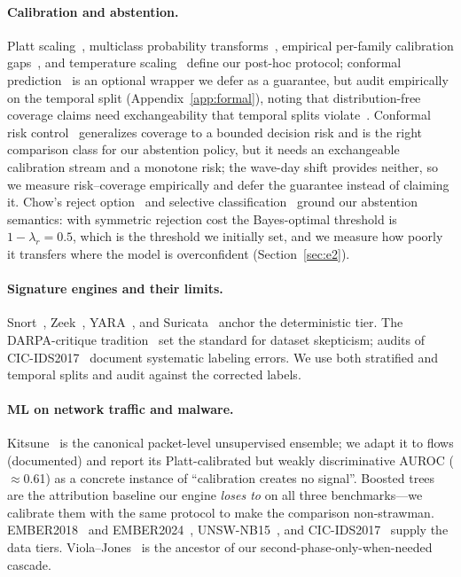 \documentclass[sigconf,anonymous=false]{acmart}
\begin{document}
\paragraph{Calibration and abstention.} Platt scaling~\cite{platt1999}, multiclass probability transforms~\cite{zadrozny2002}, empirical per-family calibration gaps~\cite{niculescu2005}, and temperature scaling~\cite{guo2017calibration} define our post-hoc protocol; conformal prediction~\cite{vovk2005,angelopoulos2021} is an optional wrapper we defer as a guarantee, but audit empirically on the temporal split (Appendix~\ref{app:formal}), noting that distribution-free coverage claims need exchangeability that temporal splits violate~\cite{barber2023}. Conformal risk control~\cite{angelopoulos2024crc} generalizes coverage to a bounded decision risk and is the right comparison class for our abstention policy, but it needs an exchangeable calibration stream and a monotone risk; the wave-day shift provides neither, so we measure risk--coverage empirically and defer the guarantee instead of claiming it. Chow's reject option~\cite{chow1970} and selective classification~\cite{geifman2017} ground our abstention semantics: with symmetric rejection cost the Bayes-optimal threshold is $1-\lambda_r = 0.5$, which is the threshold we initially set, and we measure how poorly it transfers where the model is overconfident (Section~\ref{sec:e2}).

\paragraph{Signature engines and their limits.} Snort~\cite{roesch1999snort}, Zeek~\cite{paxson1999bro}, YARA~\cite{yara}, and Suricata~\cite{suricata} anchor the deterministic tier. The DARPA-critique tradition~\cite{mchugh2000,mahoney2003} set the standard for dataset skepticism; audits of CIC-IDS2017~\cite{engelen2021,lanvin2022errors} document systematic labeling errors. We use both stratified and temporal splits and audit against the corrected labels.

\paragraph{ML on network traffic and malware.} Kitsune~\cite{mirsky2018kitsune} is the canonical packet-level unsupervised ensemble; we adapt it to flows (documented) and report its Platt-calibrated but weakly discriminative AUROC ($\approx$0.61) as a concrete instance of ``calibration creates no signal''. Boosted trees~\cite{chen2016xgboost} are the attribution baseline our engine \emph{loses to} on all three benchmarks---we calibrate them with the same protocol to make the comparison non-strawman. EMBER2018~\cite{anderson2018ember} and EMBER2024~\cite{joyce2025ember}, UNSW-NB15~\cite{moustafa2015unsw}, and CIC-IDS2017~\cite{sharafaldin2018cicids} supply the data tiers. Viola--Jones~\cite{violajones2001} is the ancestor of our second-phase-only-when-needed cascade.
\end{document}
